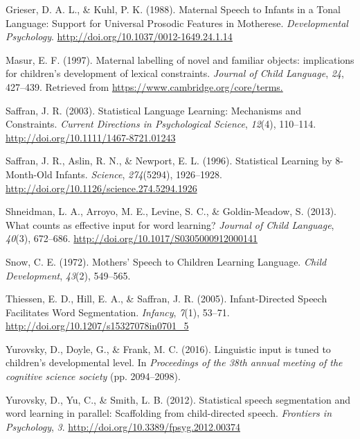 \documentclass[10pt, letterpaper]{article}
\begin{document}
\hypertarget{ref-Grieser1988}{}
Grieser, D. A. L., \& Kuhl, P. K. (1988). Maternal Speech to Infants in
a Tonal Language: Support for Universal Prosodic Features in Motherese.
\emph{Developmental Psychology}.
\url{http://doi.org/10.1037/0012-1649.24.1.14}

\hypertarget{ref-Masur1997}{}
Masur, E. F. (1997). Maternal labelling of novel and familiar objects:
implications for children's development of lexical constraints.
\emph{Journal of Child Language}, \emph{24}, 427--439. Retrieved from
\url{https://www.cambridge.org/core/terms.}

\hypertarget{ref-Saffran2003}{}
Saffran, J. R. (2003). Statistical Language Learning: Mechanisms and
Constraints. \emph{Current Directions in Psychological Science},
\emph{12}(4), 110--114. \url{http://doi.org/10.1111/1467-8721.01243}

\hypertarget{ref-Saffran1996}{}
Saffran, J. R., Aslin, R. N., \& Newport, E. L. (1996). Statistical
Learning by 8-Month-Old Infants. \emph{Science}, \emph{274}(5294),
1926--1928. \url{http://doi.org/10.1126/science.274.5294.1926}

\hypertarget{ref-Shneidman2013}{}
Shneidman, L. A., Arroyo, M. E., Levine, S. C., \& Goldin-Meadow, S.
(2013). What counts as effective input for word learning? \emph{Journal
of Child Language}, \emph{40}(3), 672--686.
\url{http://doi.org/10.1017/S0305000912000141}

\hypertarget{ref-Snow1972}{}
Snow, C. E. (1972). Mothers' Speech to Children Learning Language.
\emph{Child Development}, \emph{43}(2), 549--565.

\hypertarget{ref-Thiessen2005}{}
Thiessen, E. D., Hill, E. A., \& Saffran, J. R. (2005). Infant-Directed
Speech Facilitates Word Segmentation. \emph{Infancy}, \emph{7}(1),
53--71. \url{http://doi.org/10.1207/s15327078in0701_5}

\hypertarget{ref-Yurovsky2016}{}
Yurovsky, D., Doyle, G., \& Frank, M. C. (2016). Linguistic input is
tuned to children's developmental level. In \emph{Proceedings of the
38th annual meeting of the cognitive science society} (pp. 2094--2098).

\hypertarget{ref-Yurovsky2012}{}
Yurovsky, D., Yu, C., \& Smith, L. B. (2012). Statistical speech
segmentation and word learning in parallel: Scaffolding from
child-directed speech. \emph{Frontiers in Psychology}, \emph{3}.
\url{http://doi.org/10.3389/fpsyg.2012.00374}
\end{document}
